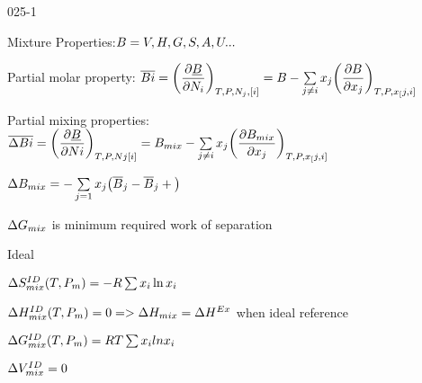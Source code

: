 \begin{mitframe}{025-1}

    
\begin{listone}
          \item Mixture Properties:$B=\vol,\enthalpy,\gibbs,\entropy,\helmholtz,\intenergy...$
                
\item Partial molar property: $\overline{B{i}}=\bigg(\dfrac{\partial\uline{B}}{\partial\nummoles_{i}}\bigg)_{\Temp,\p,\nummoles_{j},[i]}=B-\sum\limits_{j \neq i}\specfrac{j}\bigg(\dfrac{\partial B}{\partial\specfrac{j}}\bigg)_{\Temp,\p,\specfrac[j,i]}$
          
         
         
    \item Partial mixing properties: $\overline{\iipf{B}{i}}=\bigg(\dfrac{\partial\uline{B}}{\partial\nummoles{i}}\bigg)_{\Temp,\p,\nummoles{j}[i]}=B_{mix}-\sum\limits_{j\neq i}\specfrac{j}\bigg(\dfrac{\partial{B}_{mix}}{\partial\specfrac{j}}\bigg)_{\Temp,\p,\specfrac[j,i]} $
    
    \item $\iipf{B}_{mix}=-\sum\limits_{j=1}\specfrac{j}\big(\overline{B}_j-\overline{B}_j+\big)$
    
    \item $\iipf\gibbs_{mix}$ is minimum required work of separation
        
    \item Ideal

	\item $\iipf\entropy_{mix} ^{\mominertia\elecdisplace}(\Temp,\p_{\mass})=-\gasconst\sum\nolimits\specfrac{i}\ln\specfrac{i}$
    
    \item $\iipf\enthalpy_{mix}^{\mominertia\elecdisplace}(\Temp,\p_{\mass})=0=>\iipf\enthalpy_{mix}=\iipf\enthalpy^{\energy\disp}$  when ideal reference %
     
          \item $\iipf\gibbs_{mix}^{\mominertia\elecdisplace}(\Temp,\p_{\mass})=\gasconst\Temp\sum\nolimits\specfrac{i}ln\specfrac{i}$
    
    \item $\iipf\vol_{mix}^{\mominertia\elecdisplace}=0$
                   
\end{listone}			

\end{mitframe}